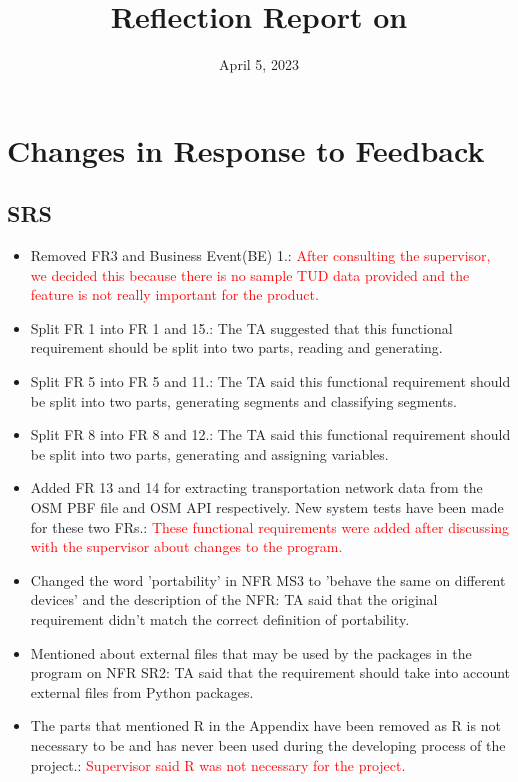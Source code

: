 \documentclass{article}
\title{Reflection Report on \progname}
\author{\authname}
\date{April 5, 2023}
\begin{document}
\maketitle


\section{Changes in Response to Feedback}



\subsection{SRS}
\begin{itemize}
    \item Removed FR3 and Business Event(BE) 1.: \textcolor{red}{After consulting the supervisor, we decided this because there is no sample TUD data provided and the feature is not really important for the product.} 
    \item Split FR 1 into FR 1 and 15.: The TA suggested that this functional requirement should be split into two parts, reading and generating.
    \item Split FR 5 into FR 5 and 11.: The TA said this functional requirement should be split into two parts, generating segments and classifying segments.
    \item Split FR 8 into FR 8 and 12.: The TA said this functional requirement should be split into two parts, generating and assigning variables.
    \item Added FR 13 and 14 for extracting transportation network data from the OSM PBF file and OSM API respectively. New system tests have been made for these two FRs.: \textcolor{red}{These functional requirements were added after discussing with the supervisor about changes to the program.}
    \item Changed the word 'portability' in NFR MS3 to 'behave the same on different devices' and the description of the NFR: TA said that the original requirement didn't match the correct definition of portability.
    \item Mentioned about external files that may be used by the packages in the program on NFR SR2: TA said that the requirement should take into account external files from Python packages.
    \item The parts that mentioned R in the Appendix have been removed as R is not necessary to be and has never been used during the developing process of the project.: \textcolor{red}{Supervisor said R was not necessary for the project.}

\end{itemize}
\end{document}
